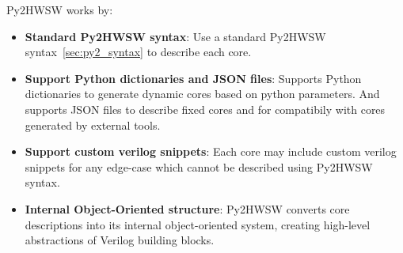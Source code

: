 %

Py2HWSW works by:
\begin{itemize}
    \item \textbf{Standard Py2HWSW syntax}: Use a standard Py2HWSW syntax~\ref{sec:py2_syntax} to describe each core.
    \item \textbf{Support Python dictionaries and JSON files}: Supports Python dictionaries to generate dynamic cores based on python parameters. And supports JSON files to describe fixed cores and for compatibily with cores generated by external tools.
    \item \textbf{Support custom verilog snippets}: Each core may include custom verilog snippets for any edge-case which cannot be described using Py2HWSW syntax.
    \item \textbf{Internal Object-Oriented structure}: Py2HWSW converts core descriptions into its internal object-oriented system, creating high-level abstractions of Verilog building blocks.
\end{itemize}
